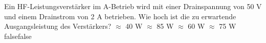     {Ein HF-Leistungsverstärker im A-Betrieb wird mit einer Drainspannung von 50 V und einem Drainstrom von 2 A betrieben. Wie hoch ist die zu erwartende Ausgangsleistung des Verstärkers?}
    {$\approx$ 40 W}
    {$\approx$ 85 W}
    {$\approx$ 60 W}
    {$\approx$ 75 W}
    {false}{false}